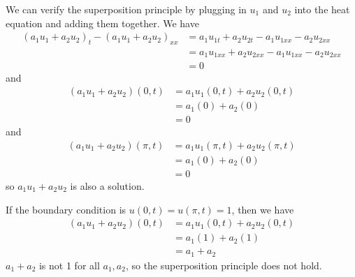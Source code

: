 \documentclass[plain]{pset}
\begin{document}
\begin{solution}
    We can verify the superposition principle by plugging in \(u_1\) and \(u_2\) into the heat equation and adding them together. We have
    \[
        \begin{aligned}
            (a_1u_1 + a_2u_2)_t - (a_1u_1 + a_2u_2)_{xx} & = a_1u_{1t} + a_2u_{2t} - a_1u_{1xx} - a_2u_{2xx}   \\
                                                         & = a_1u_{1xx} + a_2u_{2xx} - a_1u_{1xx} - a_2u_{2xx} \\
                                                         & = 0
        \end{aligned}
    \]
    and
    \[
        \begin{aligned}
            (a_1u_1 + a_2u_2)(0, t) & = a_1u_1(0, t) + a_2u_2(0, t) \\
                                    & = a_1(0) + a_2(0)             \\
                                    & = 0
        \end{aligned}
    \]
    and
    \[
        \begin{aligned}
            (a_1u_1 + a_2u_2)(\pi, t) & = a_1u_1(\pi, t) + a_2u_2(\pi, t) \\
                                      & = a_1(0) + a_2(0)                 \\
                                      & = 0
        \end{aligned}
    \]
    so \(a_1u_1 + a_2u_2\) is also a solution.

    If the boundary condition is \(u(0, t) = u(\pi, t) = 1\), then we have
    \[
        \begin{aligned}
            (a_1u_1 + a_2u_2)(0, t) & = a_1u_1(0, t) + a_2u_2(0, t) \\
                                    & = a_1(1) + a_2(1)             \\
                                    & = a_1 + a_2
        \end{aligned}
    \]
    \(a_1 + a_2\) is not 1 for all \(a_1, a_2\), so the superposition principle does not hold.
\end{solution}

\pagebreak
\end{document}
